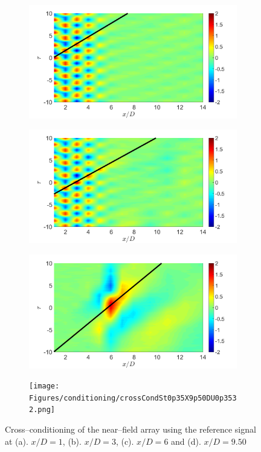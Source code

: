 \begin{figure}
	\centering
	\begin{subfigure}{.5\textwidth}
		\centering
		\includegraphics[width=0.45\linewidth]{Figures/conditioning/crossCondSt0p35X1DU0p6502.png}
		\caption{}
		\label{fig:ch3_farfield_phavg}
	\end{subfigure}%
	\begin{subfigure}{.5\textwidth}
		\centering
		\includegraphics[width=0.45\linewidth]{Figures/conditioning/crossCondSt0p35X3DU0p7053.png}
		\caption{}
		\label{fig:ch3_farfield_phavg}
	\end{subfigure}%
	\begin{subfigure}{.5\textwidth}
		\centering
		\includegraphics[width=0.45\linewidth]{Figures/conditioning/crossCondSt0p35X6DU0p4709.png}
		\caption{}
		\label{fig:ch3_farfield_phavg}
	\end{subfigure}%
	\begin{subfigure}{.5\textwidth}
		\centering
		\texttt{[image: Figures/conditioning/crossCondSt0p35X9p50DU0p3532.png]}
		\caption{}
		\label{fig:ch3_farfield_phavg}
	\end{subfigure}%
	\caption{Cross--conditioning of the near--field array using the reference signal at (a). $x/D = 1$, (b). $x/D=3$, (c). $x/D=6$ and (d). $x/D=9.50$}
	\label{fig:crossCondSt0p35}
\end{figure}

